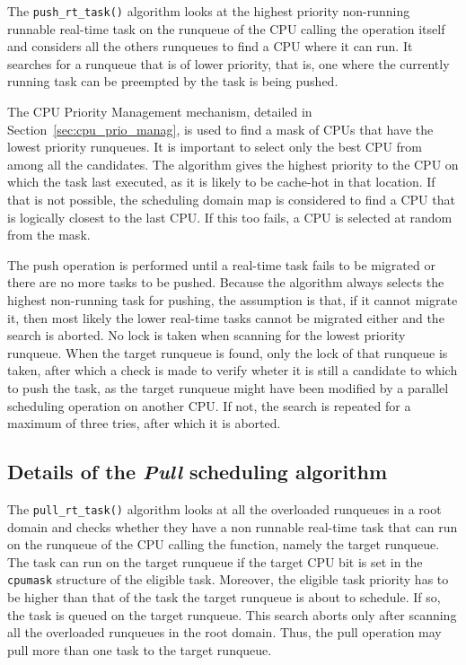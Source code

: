 The \texttt{push\_rt\_task()} algorithm looks at the highest priority
non-running runnable real-time task on the runqueue of the CPU calling
the operation itself and considers all the others runqueues to find a
CPU where it can run. It searches for a runqueue that is of lower
priority, that is, one where the currently running task can be
preempted by the task is being pushed.

The CPU Priority Management mechanism, detailed in
Section~\ref{sec:cpu_prio_manag}, is used to find a mask of CPUs that
have the lowest priority runqueues.  It is important to select only
the best CPU from among all the candidates. The algorithm gives the
highest priority to the CPU on which the task last executed, as it is
likely to be cache-hot in that location. If that is not possible, the
scheduling domain map is considered to find a CPU that is logically
closest to the last CPU. If this too fails, a CPU is selected at
random from the mask.

The push operation is performed until a real-time task fails to be
migrated or there are no more tasks to be pushed. Because the
algorithm always selects the highest non-running task for pushing, the
assumption is that, if it cannot migrate it, then most likely the
lower real-time tasks cannot be migrated either and the search is
aborted. No lock is taken when scanning for the lowest priority
runqueue.  When the target runqueue is found, only the lock of that
runqueue is taken, after which a check is made to verify wheter it is
still a candidate to which to push the task, as the target runqueue
might have been modified by a parallel scheduling operation on another
CPU. If not, the search is repeated for a maximum of three tries,
after which it is aborted.

\subsection{Details of the \emph{Pull} scheduling algorithm\label{sec:pull algorithm}}

The \texttt{pull\_rt\_task()} algorithm looks at all the overloaded
runqueues in a root domain and checks whether they have a non runnable
real-time task that can run on the runqueue of the CPU calling the
function, namely the target runqueue.  The task can run on the target
runqueue if the target CPU bit is set in the \texttt{cpumask}
structure of the eligible task. Moreover, the eligible task priority
has to be higher than that of the task the target runqueue is about to
schedule.  If so, the task is queued on the target runqueue. This
search aborts only after scanning all the overloaded runqueues in the
root domain. Thus, the pull operation may pull more than one task to
the target runqueue.

